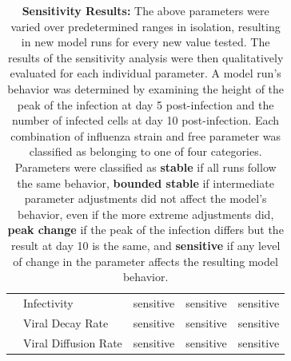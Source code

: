 \documentclass[10pt]{article}
\begin{document}
\begin{table}[!ht]
\begin{center}
\begin{tabular}{| c | l | c c c |}
  & Infectivity & \cellcolor{red!40}sensitive & \cellcolor{red!40}sensitive & \cellcolor{red!40}sensitive \\
  & Viral Decay Rate & \cellcolor{red!40}sensitive & \cellcolor{red!40}sensitive & \cellcolor{red!40}sensitive \\
  & Viral Diffusion Rate & \cellcolor{red!40}sensitive & \cellcolor{red!40}sensitive & \cellcolor{red!40}sensitive \\
  \hline  
\end{tabular}
\caption{\textbf{Sensitivity Results:} The above parameters were varied over predetermined ranges in isolation, resulting in new model runs for every new value tested.  The results of the sensitivity analysis were then qualitatively evaluated for each individual parameter.  A model run's behavior was determined by examining the height of the peak of the infection at day 5 post-infection and the number of infected cells at day 10 post-infection.  Each combination of influenza strain and free parameter was classified as belonging to one of four categories.  Parameters were classified as \textbf{stable} if all runs follow the same behavior, \textbf{bounded stable} if intermediate parameter adjustments did not affect the model's behavior, even if the more extreme adjustments did, \textbf{peak change} if the peak of the infection differs but the result at day 10 is the same, and \textbf{sensitive} if any level of change in the parameter affects the resulting model behavior.}
\label{tab:sensitivity}
\end{center}
\end{table}
\end{document}
